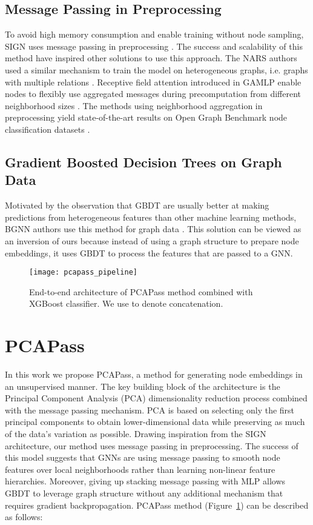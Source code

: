 \documentclass[nohyperref]{article}
\theoremstyle{plain}
\theoremstyle{definition}
\theoremstyle{remark}
\begin{document}
\subsection{Message Passing in Preprocessing}
To avoid high memory consumption and enable training without node sampling, SIGN uses message passing in preprocessing \cite{rossi20sign}. 
The success and scalability of this method have inspired other solutions to use this approach. 
The NARS authors used a similar mechanism to train the model on heterogeneous graphs, i.e. graphs with multiple relations \cite{yu2020scalable}. 
Receptive field attention introduced in GAMLP enable nodes to flexibly use aggregated messages during precomputation from different neighborhood sizes \cite{zhang2021graph}. 
The methods using neighborhood aggregation in preprocessing yield state-of-the-art results on Open Graph Benchmark node classification datasets \cite{hu2021open}.

\subsection{Gradient Boosted Decision Trees on Graph Data}
Motivated by the observation that GBDT are usually better at making predictions from heterogeneous features than other machine learning methods, BGNN authors use this method for graph data \cite{ivanov2021boost}. 
This solution can be viewed as an inversion of ours because instead of using a graph structure to prepare node embeddings, it uses GBDT to process the features that are passed to a GNN. 

\begin{figure}[H]
    \vskip 0.2in
    \begin{center}
    \centerline{\texttt{[image: pcapass\_pipeline]}}
    \caption{End-to-end architecture of PCAPass method combined with XGBoost classifier. We use \textbf{ } to denote concatenation.}
    \label{fig:pcapass_pipeline}
    \end{center}
    \vskip -0.2in
\end{figure}
\section{PCAPass}
In this work we propose PCAPass, a method for generating node embeddings in an unsupervised manner. 
The key building block of the architecture is the Principal Component Analysis (PCA) dimensionality reduction process combined with the message passing mechanism. 
PCA is based on selecting only the first principal components to obtain lower-dimensional data while preserving as much of the data's variation as possible.
Drawing inspiration from the SIGN architecture, our method uses message passing in preprocessing.
The success of this model suggests that GNNs are using message passing to smooth node features over local neighborhoods rather than learning non-linear feature hierarchies. 
Moreover, giving up stacking message passing with MLP allows GBDT to leverage graph structure without any additional mechanism that requires gradient backpropagation. 
PCAPass method (Figure~\ref{fig:pcapass_pipeline}) can be described as follows:
\end{document}
